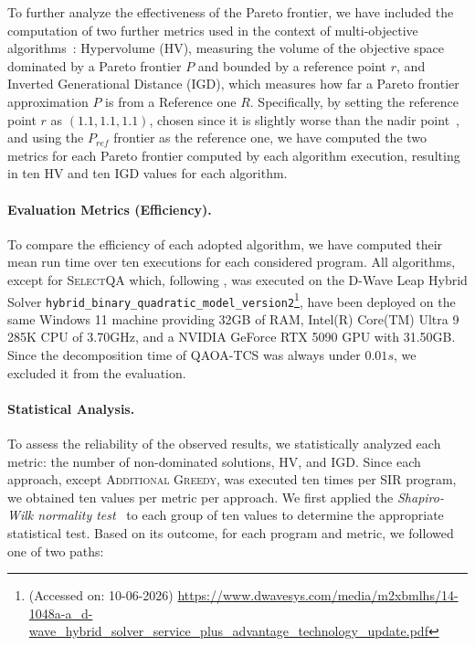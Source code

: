 To further analyze the effectiveness of the Pareto frontier, we have included the computation of two further metrics used in the context of multi-objective algorithms~\citep{nery2015hypervolume,auger2009hypervolume,moffaert2016hypervolume}: Hypervolume (HV), measuring the volume of the objective space dominated by a Pareto frontier $P$ and bounded by a reference point $r$, and Inverted Generational Distance (IGD), which measures how far a Pareto frontier approximation $P$ is from a Reference one $R$. Specifically, by setting the reference point $r$ as $(1.1,1.1,1.1)$, chosen since it is slightly worse than the nadir point~\citep{ishibuchi2018hypervolume}, and using the $P_{ref}$ frontier as the reference one, we have computed the two metrics for each Pareto frontier computed by each algorithm execution, resulting in ten HV and ten IGD values for each algorithm.

\paragraph{Evaluation Metrics (Efficiency).} To compare the efficiency of each adopted algorithm, we have computed their mean run time over ten executions for each considered program. All algorithms, except for \textsc{SelectQA} which, following \citet{selectqa}, was executed on the D-Wave Leap Hybrid Solver \texttt{hybrid\_binary\_quadratic\_model\_version2}\footnote{(Accessed on: 10-06-2026) \url{https://www.dwavesys.com/media/m2xbmlhs/14-1048a-a_d-wave_hybrid_solver_service_plus_advantage_technology_update.pdf}}, have been deployed on the same Windows 11 machine providing 32GB of RAM, Intel(R) Core(TM) Ultra 9 285K CPU of 3.70GHz, and a NVIDIA GeForce RTX 5090 GPU with 31.50GB. Since the decomposition time of \textsc{QAOA-TCS} was always under $0.01s$, we excluded it from the evaluation.

\paragraph{Statistical Analysis.}
To assess the reliability of the observed results, we statistically analyzed each metric: the number of non-dominated solutions, HV, and IGD. Since each approach, except \textsc{Additional Greedy}, was executed ten times per SIR program, we obtained ten values per metric per approach. We first applied the \textit{Shapiro-Wilk normality test}~\citep{wilkshapiro} to each group of ten values to determine the appropriate statistical test. Based on its outcome, for each program and metric, we followed one of two paths:

